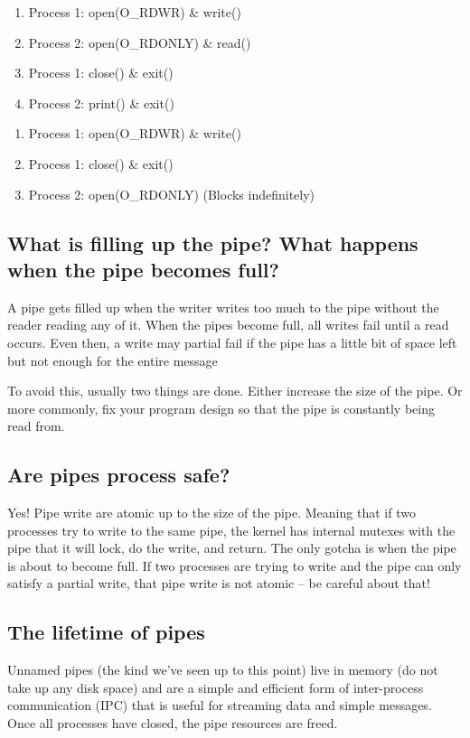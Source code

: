 \begin{enumerate}
\item Process 1: open(O\_RDWR) \& write()
\item Process 2: open(O\_RDONLY) \& read()
\item Process 1: close() \& exit()
\item Process 2: print() \& exit()
\end{enumerate}

\begin{enumerate}
\item Process 1: open(O\_RDWR) \& write()
\item Process 1: close() \& exit()
\item Process 2: open(O\_RDONLY) (Blocks indefinitely) 
\end{enumerate}

\subsection{What is filling up the pipe? What happens when the pipe
becomes
full?}\label{what-is-filling-up-the-pipe-what-happens-when-the-pipe-becomes-full}
 A pipe gets filled up when the writer writes too much to the pipe without the reader reading any of it. When the pipes become full, all writes fail until a read occurs. Even then, a write may partial fail if the pipe has a little bit of space left but not enough for the entire message 

 To avoid this, usually two things are done. Either increase the size of the pipe. Or more commonly, fix your program design so that the pipe is constantly being read from.

\subsection{Are pipes process safe?}\label{are-pipes-process-safe}

 Yes! Pipe write are atomic up to the size of the pipe. Meaning that if two processes try to write to the same pipe, the kernel has internal mutexes with the pipe that it will lock, do the write, and return. The only gotcha is when the pipe is about to become full. If two processes are trying to write and the pipe can only satisfy a partial write, that pipe write is not atomic -- be careful about that!

\subsection{The lifetime of pipes}\label{the-lifetime-of-pipes}
 Unnamed pipes (the kind we've seen up to this point) live in memory (do not take up any disk space) and are a simple and efficient form of inter-process communication (IPC) that is useful for streaming data and simple messages. Once all processes have closed, the pipe resources are freed.


